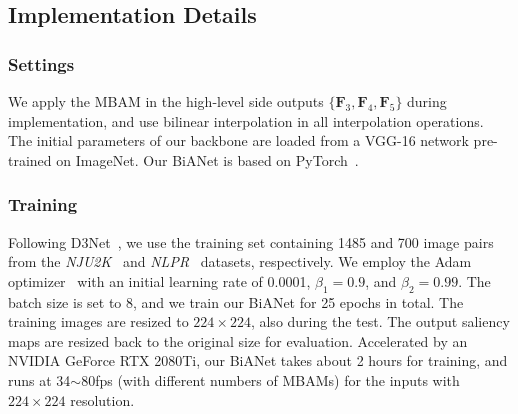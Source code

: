 \documentclass[journal]{IEEEtran}
\newcommand{\DTNet}{D3Net~\cite{fan2019D3Net}}
\begin{document}
\subsection{Implementation Details}
\subsubsection{Settings}
We apply the MBAM in the high-level side outputs $\{\mathbf{F}_3,\mathbf{F}_4,\mathbf{F}_5\}$ during implementation,
and use bilinear interpolation in all interpolation operations.
The initial parameters of our backbone are loaded from a VGG-16 network pre-trained on ImageNet.
Our BiANet is based on PyTorch~\cite{pytorch2019paszke}.



\subsubsection{Training}
Following \DTNet, we use the training set containing 1485 and 700 image pairs from the \textit{NJU2K}~\cite{ju2014depth}
and \textit{NLPR}~\cite{peng2014rgbd} datasets, respectively.
We employ the Adam optimizer~\cite{kingma2015adam} with an initial learning rate of 0.0001, $\beta_1=0.9$, and $\beta_2=0.99$.
The batch size is set to 8,
and we train our BiANet for 25 epochs in total.
The training images are resized to $224 \times 224$, also during the test.
The output saliency maps are resized back to the original size for evaluation.
Accelerated by an NVIDIA GeForce RTX 2080Ti, 
our BiANet takes about 2 hours for training, 
and runs at 34$\sim$80fps (with different numbers of MBAMs) for the inputs with $224\times224$ resolution.
\end{document}
